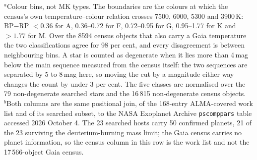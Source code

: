 \begin{table}
\smallskip
{\footnotesize $^{a}$Colour bins, not MK types. The boundaries are the colours at which the census's own temperature--colour relation crosses 7500, 6000, 5300 and 3900\,K: BP$-$RP $<0.36$ for A, 0.36--0.72 for F, 0.72--0.95 for G, 0.95--1.77 for K and $>1.77$ for M. Over the 8594 census objects that also carry a Gaia temperature the two classifications agree for 98 per cent, and every disagreement is between neighbouring bins. A star is counted as degenerate when it lies more than 4\,mag below the main sequence measured from the census itself: the two sequences are separated by 5 to 8\,mag here, so moving the cut by a magnitude either way changes the count by under 3 per cent. The five classes are normalised over the 79 non-degenerate searched stars and the 16\,815 non-degenerate census objects.\\ $^{b}$Both columns are the same positional join, of the 168-entry ALMA-covered work list and of its searched subset, to the NASA Exoplanet Archive \texttt{pscomppars} table accessed 2026 October 4. The 23 searched hosts carry 50 confirmed planets, 21 of the 23 surviving the deuterium-burning mass limit; the Gaia census carries no planet information, so the census column in this row is the work list and not the 17\,566-object Gaia census.}
\end{table}
